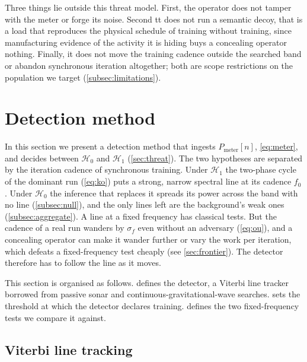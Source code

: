 \documentclass{article}
\begin{document}
Three things lie outside this threat model. First, the
operator does not tamper with the meter or forge its noise. Second tt does not run a
semantic decoy, that is a load that reproduces the physical schedule of
training without training,  since manufacturing evidence of the activity it
is hiding buys a concealing operator nothing. Finally, it does not
move the training cadence outside the searched band or abandon synchronous iteration
altogether; both are scope restrictions on the population we target
(\cref{subsec:limitations}). 

\section{Detection method}
\label{sec:methods}

In this section we present a detection method that ingests  $P_{\mathrm{meter}}[n]$, \cref{eq:meter}, and decides between $\mathcal{H}_0$ and $\mathcal{H}_1$ (\cref{sec:threat}). The two hypotheses are separated by the iteration cadence of synchronous training. Under $\mathcal{H}_1$ the two-phase cycle of the dominant run (\cref{eq:ko}) puts a strong, narrow spectral line at its cadence $f_0$. Under $\mathcal{H}_0$ the inference that replaces it spreads its power across the band with no line
(\cref{subsec:null}), and the only lines left are the background's weak ones
(\cref{subsec:aggregate}). A line at a fixed frequency has classical tests. But
the cadence of a real run wanders by $\sigma_f$ even without an adversary
(\cref{eq:ou}), and a concealing operator can make it wander further or vary
the work per iteration, which defeats a fixed-frequency test cheaply
(see \cref{sec:frontier}). The detector therefore has to follow the line as it
moves.

This section is organised as follows.  defines the
detector, a Viterbi line tracker borrowed from passive sonar and
continuous-gravitational-wave searches.  sets the threshold at which the detector declares training.
 defines the two fixed-frequency tests we compare it
against.

\subsection{Viterbi line tracking}
\label{subsec:viterbi}
\end{document}
